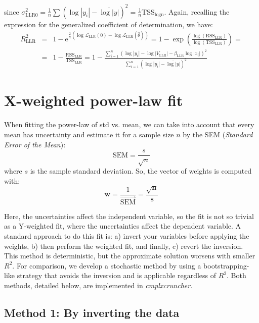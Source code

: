 \documentclass[12pt]{article}
\newcommand{\CC}[0]{\emph{cmplxcruncher}}
\begin{document}
since $\sigma^2_\text{LLR0}=\frac{1}{n}\sum\left(\log|y_i|-\overline{\log|y|}\right)^2=\frac{1}{n}\mathrm{TSS}_\text{logn}$. Again, recalling the expression for the generalized coefficient of determination, we have:
\begin{eqnarray*}
R^2_\text{LLR} &=& 1 - \mathrm{e}^{\frac{2}{n}\left(\log\mathcal{L}_\text{LLR}(0)-\log\mathcal{L}_\text{LLR}(\hat\theta)\right)} = 1 - \exp{\left(\frac{\log(\mathrm{RSS}_\text{LLR})}{\log(\mathrm{TSS}_\text{LLR})}\right)}
 =\\ &=& 1 - \frac{\mathrm{RSS}_\text{LLR}}{\mathrm{TSS}_\text{LLR}} =
 1 - \frac{\sum_{i=1}^n\left(\log|y_i|-\log|V_\text{LLR}|-\beta_\text{LLR}\log|x_i|\right)^2}{\sum_{i=1}^n\left(\log|y_i|-\overline{\log|y|}\right)^2}
\end{eqnarray*}


\section{X-weighted power-law fit}\label{sec:X-w}

When fitting the power-law of std vs. mean, we can take into account that every mean has uncertainty and estimate it for a sample size $n$ by the SEM (\emph{Standard Error of the Mean}):
$$ \mathrm{SEM} = \frac{s}{\sqrt{n}}$$
where $s$ is the sample standard deviation. So, the vector of weights is computed with:
$$ \mathbf{w} = \frac{1}{\overrightarrow{\mathrm{SEM}}} = \frac{\sqrt{\mathbf{n}}}{\mathbf{s}}$$

Here, the uncertainties affect the independent variable, so the fit is not so trivial as a Y-weighted fit, where the uncertainties affect the dependent variable. A standard approach to do this fit is: a) invert your variables before applying the weights, b) then perform the weighted fit, and finally, c) revert the inversion. This method is deterministic, but the approximate solution worsens with smaller $R^2$. For comparison, we develop a stochastic method by using a bootstrapping-like strategy that avoids the inversion and is applicable regardless of $R^2$. Both methods, detailed below, are implemented in \CC.

\subsection{Method 1: By inverting the data}
\end{document}
